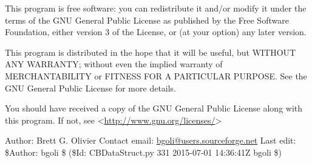 \documentclass[a4paper,11pt,english]{sphinxmanual}
\begin{document}
This program is free software: you can redistribute it and/or modify
it under the terms of the GNU General Public License as published by
the Free Software Foundation, either version 3 of the License, or
(at your option) any later version.

This program is distributed in the hope that it will be useful,
but WITHOUT ANY WARRANTY; without even the implied warranty of
MERCHANTABILITY or FITNESS FOR A PARTICULAR PURPOSE.  See the
GNU General Public License for more details.

You should have received a copy of the GNU General Public License
along with this program.  If not, see \textless{}\href{http://www.gnu.org/licenses/}{http://www.gnu.org/licenses/}\textgreater{}

Author: Brett G. Olivier
Contact email: \href{mailto:bgoli@users.sourceforge.net}{bgoli@users.sourceforge.net}
Last edit: \$Author: bgoli \$ (\$Id: CBDataStruct.py 331 2015-07-01 14:36:41Z bgoli \$)
\end{document}
